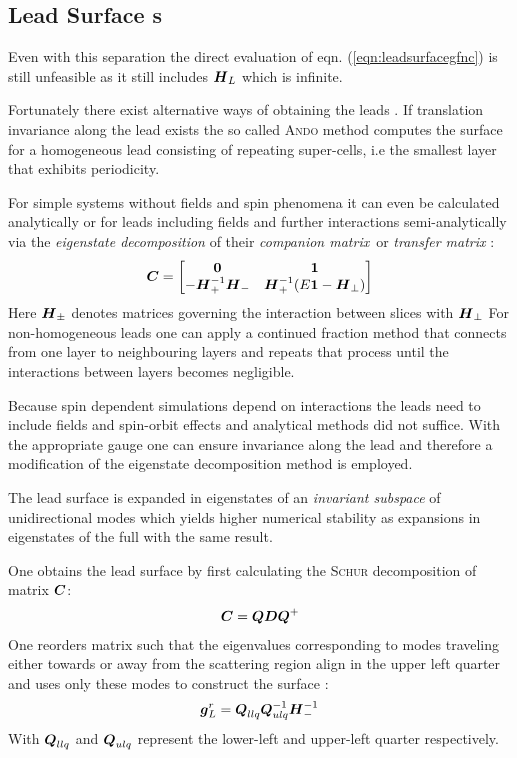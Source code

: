 \subsection{Lead Surface \cgfnc s}
Even with this separation the direct evaluation of eqn. (\ref{eqn:leadsurfacegfnc}) is still unfeasible as it still includes $\boldsymbol{H}_L$ which is infinite.\par Fortunately there exist alternative ways of obtaining the leads \gfnc{}.
If translation invariance along the lead exists the so called \textsc{Ando} method \cite{PhysRevB.44.8017} computes the surface \gfnc{} for a homogeneous lead consisting of repeating super-cells, i.e the smallest layer that exhibits periodicity.\par
For simple systems without fields and spin phenomena it can even be calculated analytically \cite{Datta1997} or for leads including fields and further interactions semi-analytically via the \emph{eigenstate decomposition} of their \emph{companion matrix}\,\cite{PhysRevB.25.3975} or \emph{transfer matrix} \cite{PhysRevB.55.5266} \cite{PhysRevB.66.205319}:
\begin{align}
  \boldsymbol{C} =
  \begin{bmatrix}
  \boldsymbol{0}  &\boldsymbol{1} \\
  -\boldsymbol{H}_{+}^{-1}\boldsymbol{H}_{-} &\boldsymbol{H}_{+}^{-1} (E\boldsymbol{1} - \boldsymbol{H}_{\perp})
  \end{bmatrix}
  \label{eqn:companionmatrix}
\end{align}
Here $\boldsymbol{H}_{\pm}$ denotes matrices governing the interaction between slices with \hamil{} $\boldsymbol{H}_{\perp}$
For non-homogeneous leads one can apply a continued fraction method \cite{Velev2004} that connects \gfnc{} from one layer to neighbouring layers and repeats that process until the interactions between layers becomes negligible.\par
Because spin dependent simulations depend on interactions the leads need to include fields and spin-orbit effects and analytical methods did not suffice. With the appropriate gauge one can ensure invariance along the lead and therefore a modification of the eigenstate decomposition method is employed.\par
The lead surface \gfnc{} is expanded in eigenstates of an \emph{invariant subspace} of unidirectional modes which yields higher numerical stability as expansions in eigenstates of the full \hamil{} with the same result\cite{Wimmer2009JComPhys}.\par
One obtains the lead surface \gfnc{} by first calculating the \textsc{Schur} decomposition of matrix $\boldsymbol{C}$:
\begin{align}
\boldsymbol{C} = \boldsymbol{Q}\boldsymbol{D}\boldsymbol{Q}^+
\label{eqn:schurdecomposition}
\end{align}
One reorders matrix  such that the eigenvalues corresponding to modes traveling either towards or away from the scattering region align in the upper left quarter and uses only these modes to construct the surface \gfnc{}:
\begin{align}
\boldsymbol{g}^r_L = \boldsymbol{Q}_{llq}\boldsymbol{Q}_{ulq}^{-1}\boldsymbol{H}_{-}^{-1}
\end{align}
With $\boldsymbol{Q}_{llq}$ and $\boldsymbol{Q}_{ulq}$ represent the lower-left and upper-left quarter respectively. 
